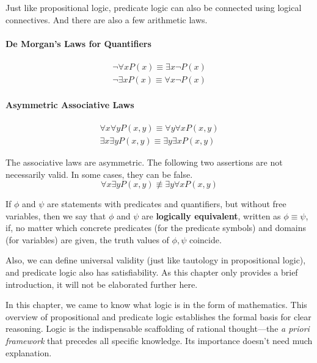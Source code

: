 \documentclass[oneside]{book}
\begin{document}
Just like propositional logic, predicate logic can also be connected using logical connectives. And there are also a few arithmetic laws.

\paragraph{De Morgan's Laws for Quantifiers}
\begin{align*}
    \neg \forall x P(x) \equiv \exists x \neg P(x) \\
    \neg \exists x P(x) \equiv \forall x \neg P(x)
\end{align*}

\paragraph{Asymmetric Associative Laws}
\begin{align*}
    \forall x \forall y P(x,y) \equiv \forall y \forall x P(x,y) \\
    \exists x \exists y P(x,y) \equiv \exists y \exists x P(x,y)
\end{align*}
\begin{note}
The associative laws are asymmetric. The following two assertions are not necessarily valid. In some cases, they can be false.
$$ \forall x \exists y P(x,y) \not\equiv \exists y \forall x P(x,y) $$
\end{note}

\begin{definition}
If $\phi$ and $\psi$ are statements with predicates and quantifiers, but without free variables, then we say that $\phi$ and $\psi$ are \textbf{logically equivalent}, written as $\phi \equiv \psi$, if, no matter which concrete predicates (for the predicate symbols) and domains (for variables) are given, the truth values of $\phi, \psi$ coincide.
\end{definition}

Also, we can define universal validity (just like tautology in propositional logic), and predicate logic also has satisfiability. As this chapter only provides a brief introduction, it will not be elaborated further here.

In this chapter, we came to know what logic is in the form of mathematics. This overview of propositional and predicate logic establishes the formal basis for clear reasoning. Logic is the indispensable scaffolding of rational thought—the \emph{a priori framework} that precedes all specific knowledge. Its importance doesn't need much explanation.
\end{document}
